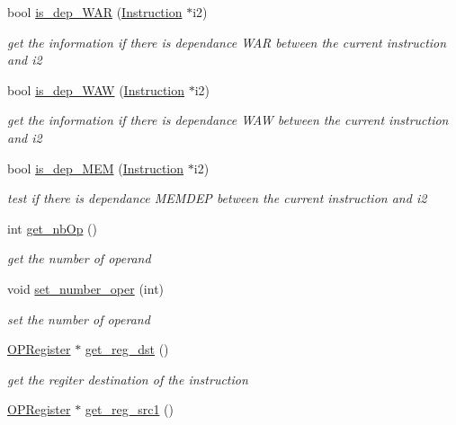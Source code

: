 \begin{DoxyCompactItemize}
bool \hyperlink{class_instruction_ae79b239c6ab30a15064b5a00944ad65a}{is\-\_\-dep\-\_\-\-W\-A\-R} (\hyperlink{class_instruction}{Instruction} $\ast$i2)
\begin{DoxyCompactList}\small\item\em get the information if there is dependance W\-A\-R between the current instruction and i2 \end{DoxyCompactList}\item 
bool \hyperlink{class_instruction_a30c159faa5c462bb2c7ae7562c9c8254}{is\-\_\-dep\-\_\-\-W\-A\-W} (\hyperlink{class_instruction}{Instruction} $\ast$i2)
\begin{DoxyCompactList}\small\item\em get the information if there is dependance W\-A\-W between the current instruction and i2 \end{DoxyCompactList}\item 
bool \hyperlink{class_instruction_a28526bda91b964d7fd81f85cee02c624}{is\-\_\-dep\-\_\-\-M\-E\-M} (\hyperlink{class_instruction}{Instruction} $\ast$i2)
\begin{DoxyCompactList}\small\item\em test if there is dependance M\-E\-M\-D\-E\-P between the current instruction and i2 \end{DoxyCompactList}\item 
int \hyperlink{class_instruction_a044a281355f25375a7765f24bdf614f3}{get\-\_\-nb\-Op} ()
\begin{DoxyCompactList}\small\item\em get the number of operand \end{DoxyCompactList}\item 
\hypertarget{class_instruction_a6ff2d531dffa43d3db22194459336d33}{void \hyperlink{class_instruction_a6ff2d531dffa43d3db22194459336d33}{set\-\_\-number\-\_\-oper} (int)}\label{class_instruction_a6ff2d531dffa43d3db22194459336d33}

\begin{DoxyCompactList}\small\item\em set the number of operand \end{DoxyCompactList}\item 
\hypertarget{class_instruction_adb43e7019987daebb3970335aba695cc}{\hyperlink{class_o_p_register}{O\-P\-Register} $\ast$ \hyperlink{class_instruction_adb43e7019987daebb3970335aba695cc}{get\-\_\-reg\-\_\-dst} ()}\label{class_instruction_adb43e7019987daebb3970335aba695cc}

\begin{DoxyCompactList}\small\item\em get the regiter destination of the instruction \end{DoxyCompactList}\item 
\hypertarget{class_instruction_ac353a6ad2b3f3b1aee179d5910b5127b}{\hyperlink{class_o_p_register}{O\-P\-Register} $\ast$ \hyperlink{class_instruction_ac353a6ad2b3f3b1aee179d5910b5127b}{get\-\_\-reg\-\_\-src1} ()}\label{class_instruction_ac353a6ad2b3f3b1aee179d5910b5127b}


\end{DoxyCompactItemize}
